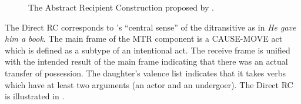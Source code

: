 \begin{figure}[t]
\caption{The Abstract Recipient Construction proposed by \citet{kay05argument}.}
\label{f:arc}
\end{figure}

The Direct RC corresponds to \citet{goldberg95construction}'s ``central sense'' of the ditransitive as in {\em He gave him a book}. The main frame of the MTR component is a CAUSE-MOVE act which is defined as a subtype of an intentional act. The receive frame is unified with the intended result of the main frame indicating that there was an actual transfer of possession. The daughter's valence list indicates that it takes verbs which have at least two arguments (an actor and an undergoer). The Direct RC is illustrated in .

